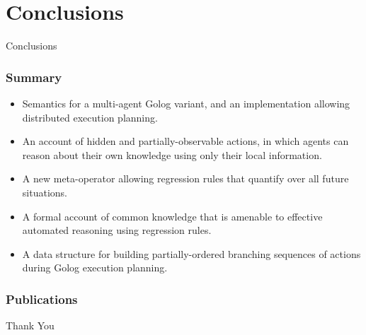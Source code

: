 \documentclass{beamer}
\begin{document}
\section{Conclusions}

\begin{frame}
\centering \large Conclusions\\
\end{frame}


\begin{frame}
  \frametitle{Summary}
  \begin{itemize}
  \item Semantics for a multi-agent Golog variant, and an implementation allowing distributed execution planning.
  \item An account of hidden and partially-observable actions, in which agents can reason about their own knowledge using only their local information.
  \item A new meta-operator allowing regression rules that quantify over all future situations.
  \item A formal account of common knowledge that is amenable to effective automated reasoning using regression rules.
  \item A data structure for building partially-ordered branching sequences of actions during Golog execution planning.
  \end{itemize}
\end{frame}

\begin{frame}
\frametitle{Publications}
\small
\nocite{kelly06hlp_dps}
\nocite{kelly07sc_persistence}
\nocite{kelly07sc_know_obs}
\nocite{kelly08complex_epistemic_modalities}


\normalsize
\end{frame}

\begin{frame}
\centering \large Thank You\\
\end{frame}
\end{document}
